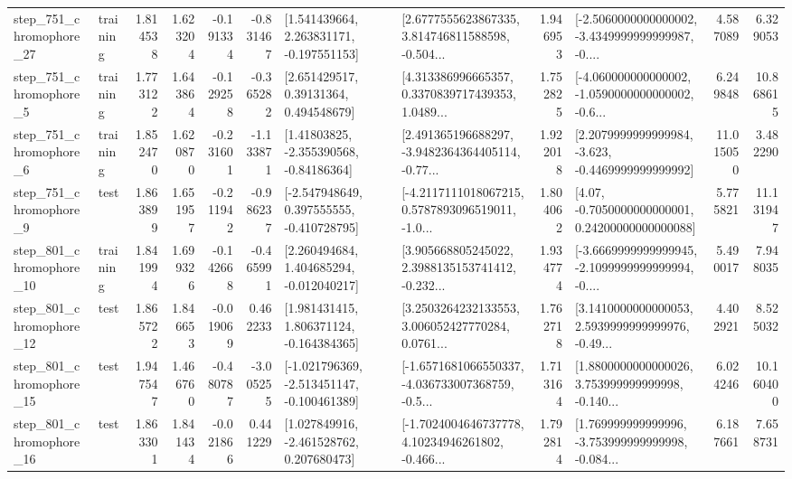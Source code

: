 \begin{tabular}{llrrrrllrlrr}
  step\_751\_chromophore\_27 &  training &      1.814538 &    1.623204 &     -0.191334 & -0.831467 &    [1.541439664, 2.263831171, -0.197551153] &  [2.6777555623867335, 3.814746811588598, -0.504... &       1.946953 &  [-2.5060000000000002, -3.4349999999999987, -0.... &            4.587089 &          6.329053 \\
   step\_751\_chromophore\_5 &  training &      1.773122 &    1.643864 &     -0.129258 & -0.365282 &      [2.651429517, 0.39131364, 0.494548679] &  [4.313386996665357, 0.3370839717439353, 1.0489... &       1.752825 &  [-4.060000000000002, -1.0590000000000002, -0.6... &            6.249848 &         10.868615 \\
   step\_751\_chromophore\_6 &  training &      1.852470 &    1.620870 &     -0.231601 & -1.133871 &     [1.41803825, -2.355390568, -0.84186364] &  [2.491365196688297, -3.9482364364405114, -0.77... &       1.922018 &  [2.2079999999999984, -3.623, -0.4469999999999992] &           11.015050 &          3.482290 \\
   step\_751\_chromophore\_9 &      test &      1.863899 &    1.651957 &     -0.211942 & -0.986237 &   [-2.547948649, 0.397555555, -0.410728795] &  [-4.2117111018067215, 0.5787893096519011, -1.0... &       1.804062 &   [4.07, -0.7050000000000001, 0.24200000000000088] &            5.775821 &         11.131947 \\
  step\_801\_chromophore\_10 &  training &      1.841994 &    1.699326 &     -0.142668 & -0.465991 &    [2.260494684, 1.404685294, -0.012040217] &  [3.905668805245022, 2.3988135153741412, -0.232... &       1.934774 &  [-3.6669999999999945, -2.1099999999999994, -0.... &            5.490017 &          7.948035 \\
  step\_801\_chromophore\_12 &      test &      1.865722 &    1.846653 &     -0.019069 &  0.462233 &    [1.981431415, 1.806371124, -0.164384365] &  [3.2503264232133553, 3.006052427770284, 0.0761... &       1.762718 &  [3.1410000000000053, 2.5939999999999976, -0.49... &            4.402921 &          8.525032 \\
  step\_801\_chromophore\_15 &      test &      1.947547 &    1.466760 &     -0.480787 & -3.005255 &  [-1.021796369, -2.513451147, -0.100461389] &  [-1.6571681066550337, -4.036733007368759, -0.5... &       1.713164 &  [1.8800000000000026, 3.753999999999998, -0.140... &            6.024246 &         10.160400 \\
  step\_801\_chromophore\_16 &      test &      1.863301 &    1.841434 &     -0.021866 &  0.441229 &    [1.027849916, -2.461528762, 0.207680473] &  [-1.7024004646737778, 4.10234946261802, -0.466... &       1.792814 &  [1.769999999999996, -3.753999999999998, -0.084... &            6.187661 &          7.658731 \\

\end{tabular}
